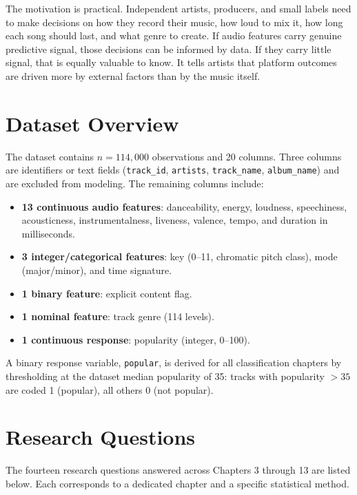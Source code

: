 \documentclass[12pt, oneside]{book}
\begin{document}
The motivation is practical. Independent artists, producers, and small labels need to make decisions on how they record their music, how loud to mix it, how long each song should last, and what genre to create. If audio features carry genuine predictive signal, those decisions can be informed by data. If they carry little signal, that is equally valuable to know. It tells artists that platform outcomes are driven more by external factors than by the music itself.

\section{Dataset Overview}

The dataset contains $n = 114{,}000$ observations and 20 columns. Three columns are identifiers or text fields (\texttt{track\_id}, \texttt{artists}, \texttt{track\_name}, \texttt{album\_name}) and are excluded from modeling. The remaining columns include:

\begin{itemize}[noitemsep]
    \item \textbf{13 continuous audio features}: danceability, energy, loudness, speechiness, acousticness, instrumentalness, liveness, valence, tempo, and duration in milliseconds.
    \item \textbf{3 integer/categorical features}: key (0--11, chromatic pitch class), mode (major/minor), and time signature.
    \item \textbf{1 binary feature}: explicit content flag.
    \item \textbf{1 nominal feature}: track genre (114 levels).
    \item \textbf{1 continuous response}: popularity (integer, 0--100).
\end{itemize}

A binary response variable, \texttt{popular}, is derived for all classification chapters by thresholding at the dataset median popularity of 35: tracks with popularity $> 35$ are coded 1 (popular), all others 0 (not popular).

\section{Research Questions}

The fourteen research questions answered across Chapters 3 through 13 are listed below. Each corresponds to a dedicated chapter and a specific statistical method.
\end{document}
